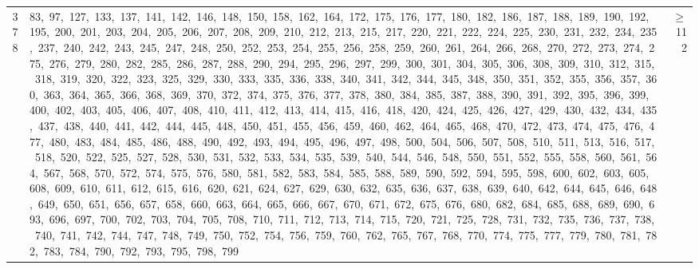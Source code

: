 \begin{longtable}{c|p{}|r}
378 & 83,\ 97,\ 127,\ 133,\ 137,\ 141,\ 142,\ 146,\ 148,\ 150,\ 158,\ 162,\ 164,\ 172,\ 175,\ 176,\ 177,\ 180,\ 182,\ 186,\ 187,\ 188,\ 189,\ 190,\ 192,\ 195,\ 200,\ 201,\ 203,\ 204,\ 205,\ 206,\ 207,\ 208,\ 209,\ 210,\ 212,\ 213,\ 215,\ 217,\ 220,\ 221,\ 222,\ 224,\ 225,\ 230,\ 231,\ 232,\ 234,\ 235,\ 237,\ 240,\ 242,\ 243,\ 245,\ 247,\ 248,\ 250,\ 252,\ 253,\ 254,\ 255,\ 256,\ 258,\ 259,\ 260,\ 261,\ 264,\ 266,\ 268,\ 270,\ 272,\ 273,\ 274,\ 275,\ 276,\ 279,\ 280,\ 282,\ 285,\ 286,\ 287,\ 288,\ 290,\ 294,\ 295,\ 296,\ 297,\ 299,\ 300,\ 301,\ 304,\ 305,\ 306,\ 308,\ 309,\ 310,\ 312,\ 315,\ 318,\ 319,\ 320,\ 322,\ 323,\ 325,\ 329,\ 330,\ 333,\ 335,\ 336,\ 338,\ 340,\ 341,\ 342,\ 344,\ 345,\ 348,\ 350,\ 351,\ 352,\ 355,\ 356,\ 357,\ 360,\ 363,\ 364,\ 365,\ 366,\ 368,\ 369,\ 370,\ 372,\ 374,\ 375,\ 376,\ 377,\ 378,\ 380,\ 384,\ 385,\ 387,\ 388,\ 390,\ 391,\ 392,\ 395,\ 396,\ 399,\ 400,\ 402,\ 403,\ 405,\ 406,\ 407,\ 408,\ 410,\ 411,\ 412,\ 413,\ 414,\ 415,\ 416,\ 418,\ 420,\ 424,\ 425,\ 426,\ 427,\ 429,\ 430,\ 432,\ 434,\ 435,\ 437,\ 438,\ 440,\ 441,\ 442,\ 444,\ 445,\ 448,\ 450,\ 451,\ 455,\ 456,\ 459,\ 460,\ 462,\ 464,\ 465,\ 468,\ 470,\ 472,\ 473,\ 474,\ 475,\ 476,\ 477,\ 480,\ 483,\ 484,\ 485,\ 486,\ 488,\ 490,\ 492,\ 493,\ 494,\ 495,\ 496,\ 497,\ 498,\ 500,\ 504,\ 506,\ 507,\ 508,\ 510,\ 511,\ 513,\ 516,\ 517,\ 518,\ 520,\ 522,\ 525,\ 527,\ 528,\ 530,\ 531,\ 532,\ 533,\ 534,\ 535,\ 539,\ 540,\ 544,\ 546,\ 548,\ 550,\ 551,\ 552,\ 555,\ 558,\ 560,\ 561,\ 564,\ 567,\ 568,\ 570,\ 572,\ 574,\ 575,\ 576,\ 580,\ 581,\ 582,\ 583,\ 584,\ 585,\ 588,\ 589,\ 590,\ 592,\ 594,\ 595,\ 598,\ 600,\ 602,\ 603,\ 605,\ 608,\ 609,\ 610,\ 611,\ 612,\ 615,\ 616,\ 620,\ 621,\ 624,\ 627,\ 629,\ 630,\ 632,\ 635,\ 636,\ 637,\ 638,\ 639,\ 640,\ 642,\ 644,\ 645,\ 646,\ 648,\ 649,\ 650,\ 651,\ 656,\ 657,\ 658,\ 660,\ 663,\ 664,\ 665,\ 666,\ 667,\ 670,\ 671,\ 672,\ 675,\ 676,\ 680,\ 682,\ 684,\ 685,\ 688,\ 689,\ 690,\ 693,\ 696,\ 697,\ 700,\ 702,\ 703,\ 704,\ 705,\ 708,\ 710,\ 711,\ 712,\ 713,\ 714,\ 715,\ 720,\ 721,\ 725,\ 728,\ 731,\ 732,\ 735,\ 736,\ 737,\ 738,\ 740,\ 741,\ 742,\ 744,\ 747,\ 748,\ 749,\ 750,\ 752,\ 754,\ 756,\ 759,\ 760,\ 762,\ 765,\ 767,\ 768,\ 770,\ 774,\ 775,\ 777,\ 779,\ 780,\ 781,\ 782,\ 783,\ 784,\ 790,\ 792,\ 793,\ 795,\ 798,\ 799 & $\ge$ 112 \\

\end{longtable}
